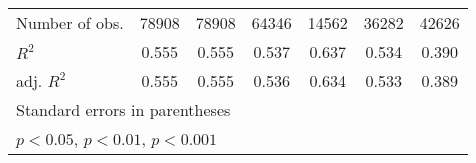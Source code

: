 \documentclass{article}
\begin{document}
{\begin{tabular}{l*{6}{c}}
\hline
Number of obs.       &       78908         &       78908         &       64346         &       14562         &       36282         &       42626         \\
\(R^{2}\)   &       0.555         &       0.555         &       0.537         &       0.637         &       0.534         &       0.390         \\
adj. \(R^{2}\)&       0.555         &       0.555         &       0.536         &       0.634         &       0.533         &       0.389         \\
\hline\hline
\multicolumn{7}{l}{\footnotesize Standard errors in parentheses}\\
\multicolumn{7}{l}{\footnotesize \sym{*} \(p<0.05\), \sym{**} \(p<0.01\), \sym{***} \(p<0.001\)}\\
\end{tabular}
}
\
\end{document}
